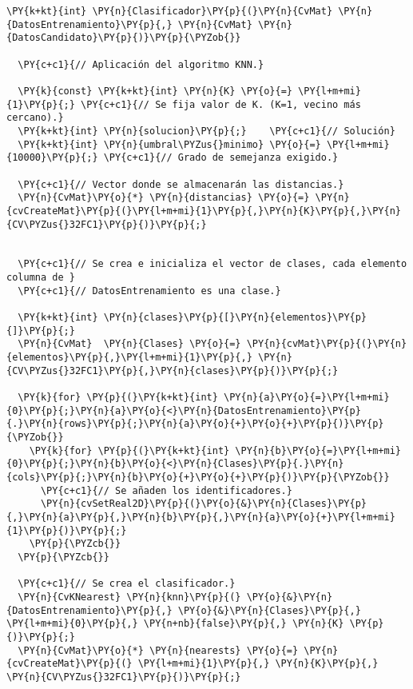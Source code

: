 \begin{Verbatim}[commandchars=\\\{\}]
\PY{k+kt}{int} \PY{n}{Clasificador}\PY{p}{(}\PY{n}{CvMat} \PY{n}{DatosEntrenamiento}\PY{p}{,} \PY{n}{CvMat} \PY{n}{DatosCandidato}\PY{p}{)}\PY{p}{\PYZob{}}

  \PY{c+c1}{// Aplicación del algoritmo KNN.}
  
  \PY{k}{const} \PY{k+kt}{int} \PY{n}{K} \PY{o}{=} \PY{l+m+mi}{1}\PY{p}{;} \PY{c+c1}{// Se fija valor de K. (K=1, vecino más cercano).}
  \PY{k+kt}{int} \PY{n}{solucion}\PY{p}{;}    \PY{c+c1}{// Solución}
  \PY{k+kt}{int} \PY{n}{umbral\PYZus{}minimo} \PY{o}{=} \PY{l+m+mi}{10000}\PY{p}{;} \PY{c+c1}{// Grado de semejanza exigido.}

  \PY{c+c1}{// Vector donde se almacenarán las distancias.}
  \PY{n}{CvMat}\PY{o}{*} \PY{n}{distancias} \PY{o}{=} \PY{n}{cvCreateMat}\PY{p}{(}\PY{l+m+mi}{1}\PY{p}{,}\PY{n}{K}\PY{p}{,}\PY{n}{CV\PYZus{}32FC1}\PY{p}{)}\PY{p}{;}
 
  
  \PY{c+c1}{// Se crea e inicializa el vector de clases, cada elemento columna de }
  \PY{c+c1}{// DatosEntrenamiento es una clase.}
 
  \PY{k+kt}{int} \PY{n}{clases}\PY{p}{[}\PY{n}{elementos}\PY{p}{]}\PY{p}{;}	
  \PY{n}{CvMat}  \PY{n}{Clases} \PY{o}{=} \PY{n}{cvMat}\PY{p}{(}\PY{n}{elementos}\PY{p}{,}\PY{l+m+mi}{1}\PY{p}{,} \PY{n}{CV\PYZus{}32FC1}\PY{p}{,}\PY{n}{clases}\PY{p}{)}\PY{p}{;}
  
  \PY{k}{for} \PY{p}{(}\PY{k+kt}{int} \PY{n}{a}\PY{o}{=}\PY{l+m+mi}{0}\PY{p}{;}\PY{n}{a}\PY{o}{<}\PY{n}{DatosEntrenamiento}\PY{p}{.}\PY{n}{rows}\PY{p}{;}\PY{n}{a}\PY{o}{+}\PY{o}{+}\PY{p}{)}\PY{p}{\PYZob{}}
    \PY{k}{for} \PY{p}{(}\PY{k+kt}{int} \PY{n}{b}\PY{o}{=}\PY{l+m+mi}{0}\PY{p}{;}\PY{n}{b}\PY{o}{<}\PY{n}{Clases}\PY{p}{.}\PY{n}{cols}\PY{p}{;}\PY{n}{b}\PY{o}{+}\PY{o}{+}\PY{p}{)}\PY{p}{\PYZob{}}
      \PY{c+c1}{// Se añaden los identificadores.}
      \PY{n}{cvSetReal2D}\PY{p}{(}\PY{o}{&}\PY{n}{Clases}\PY{p}{,}\PY{n}{a}\PY{p}{,}\PY{n}{b}\PY{p}{,}\PY{n}{a}\PY{o}{+}\PY{l+m+mi}{1}\PY{p}{)}\PY{p}{;}
    \PY{p}{\PYZcb{}}
  \PY{p}{\PYZcb{}}
  
  \PY{c+c1}{// Se crea el clasificador.}
  \PY{n}{CvKNearest} \PY{n}{knn}\PY{p}{(} \PY{o}{&}\PY{n}{DatosEntrenamiento}\PY{p}{,} \PY{o}{&}\PY{n}{Clases}\PY{p}{,} \PY{l+m+mi}{0}\PY{p}{,} \PY{n+nb}{false}\PY{p}{,} \PY{n}{K} \PY{p}{)}\PY{p}{;}
  \PY{n}{CvMat}\PY{o}{*} \PY{n}{nearests} \PY{o}{=} \PY{n}{cvCreateMat}\PY{p}{(} \PY{l+m+mi}{1}\PY{p}{,} \PY{n}{K}\PY{p}{,} \PY{n}{CV\PYZus{}32FC1}\PY{p}{)}\PY{p}{;}
  

\end{Verbatim}
